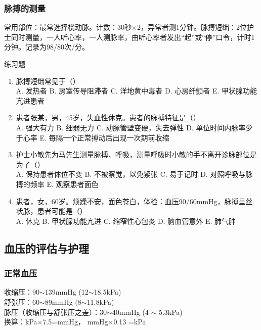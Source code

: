 \documentclass[11pt, a4paper]{ctexart}
\begin{document}
\subsubsection{脉搏的测量}
常用部位：最常选择桡动脉。计数：30秒×2，异常者测1分钟。脉搏短绌：2位护士同时测量，一人听心率，一人测脉率，由听心率者发出“起”或“停”口令，计时1分钟。记录为98/80次/分。

\begin{examplebox}{练习题}
	\begin{enumerate}
		\item 脉搏短绌常见于（\qquad）\\
		      A. 发热者 \quad B. 房室传导阻滞者 \quad C. 洋地黄中毒者 \quad D. 心房纤颤者 \quad E. 甲状腺功能亢进患者
		\item 患者张某，男，45岁，失血性休克。患者的脉搏特征是（\qquad）\\
		      A. 强大有力 \quad B. 细弱无力 \quad C. 动脉管壁变硬，失去弹性 \quad D. 单位时间内脉率少于心率 \quad E. 每隔一个正常搏动后出现一次期前收缩
		\item 护士小敏先为马先生测量脉搏、呼吸，测量呼吸时小敏的手不离开诊脉部位是为了（\qquad）\\
		      A. 保持患者体位不变 \quad B. 不被察觉，以免紧张 \quad C. 易于记时 \quad D. 对照呼吸与脉搏的频率 \quad E. 观察患者面色
		\item 患者，女，60岁。烦躁不安，面色苍白，体检：血压90/60mmHg，脉搏呈丝状脉，患者可能是（\qquad）\\
		      A. 休克 \quad B. 甲状腺功能亢进 \quad C. 缩窄性心包炎 \quad D. 脑血管意外 \quad E. 肺气肿
	\end{enumerate}
\end{examplebox}

\subsection{血压的评估与护理}
\subsubsection{正常血压}
收缩压：90$\sim$139mmHg (12$\sim$18.5kPa) \\
舒张压：60$\sim$89mmHg (8$\sim$11.8kPa) \\
脉压（收缩压与舒张压之差）：30$\sim$40mmHg (4 $\sim$ 5.3kPa) \\
换算：kPa×7.5=mmHg， mmHg×0.13 =kPa
\end{document}
